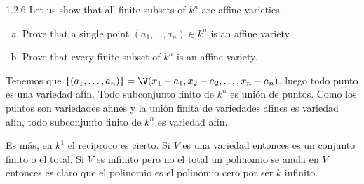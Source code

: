 \documentclass[twoside]{article}
\begin{document}
\begin{ejercicio}{1.2.6}
Let us show that all finite subsets of $k^n$ are affine varieties.
\begin{enumerate}[a.]
\item Prove that a single point $(a_1,\dots,a_n) \in k^n$ is an affine variety.
\item Prove that every finite subset of $k^n$ is an affine variety.
\end{enumerate}
\end{ejercicio}
\begin{solucion}
Tenemos que $\{(a_1,\dots,a_n)\} = \V(x_1-a_1,x_2-a_2,\dots,x_n-a_n)$, luego todo punto es una variedad afín.
Todo subconjunto finito de $k^n$ es unión de puntos.
Como los puntos son variedades afines y la unión finita de variedades afines es variedad afín, todo subconjunto finito de $k^n$ es variedad afín. 

Es más, en $k^1$ el recíproco es cierto. Si $V$ es una variedad entonces es un conjunto finito o el total. Si $V$ es infinito pero no el total un polinomio se anula en $V$ entonces es claro que el polinomio es el polinomio cero por ser $k$ infinito.
\end{solucion}

\newpage
\end{document}
